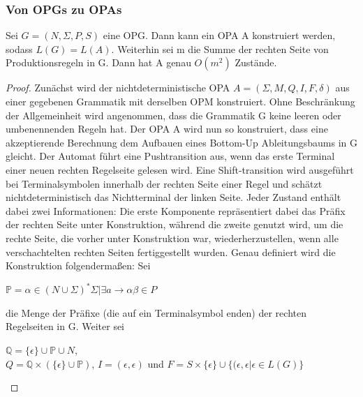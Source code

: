 \subsubsection{Von OPGs zu OPAs}
\label{opgopa}
\begin{lemma}
Sei $G=(N,\Sigma, P, S)$ eine OPG. Dann kann ein OPA A konstruiert werden, sodass $L(G)=L(A)$. Weiterhin sei m die Summe der rechten Seite von Produktionsregeln in G. Dann hat A genau $O(m^2)$ Zustände.
\end{lemma}
\begin{proof}
Zunächst wird der nichtdeterministische OPA $A=(\Sigma, M, Q, I,F, \delta)$ aus einer gegebenen Grammatik mit derselben OPM konstruiert.
Ohne Beschränkung der Allgemeinheit wird angenommen, dass die Grammatik G keine leeren oder umbenennenden Regeln hat. Der OPA A wird nun so konstruiert, dass eine akzeptierende Berechnung dem Aufbauen eines Bottom-Up Ableitungsbaums in G gleicht. Der Automat führt eine Pushtransition aus, wenn das erste Terminal einer neuen rechten Regelseite gelesen wird. Eine Shift-transition  wird ausgeführt bei Terminalsymbolen innerhalb der rechten Seite einer Regel und schätzt nichtdeterministisch das Nichtterminal der linken Seite. Jeder Zustand enthält dabei zwei Informationen: Die erste Komponente repräsentiert dabei das Präfix der rechten Seite unter Konstruktion, während die zweite genutzt wird, um die rechte Seite, die vorher unter Konstruktion war, wiederherzustellen, wenn alle verschachtelten rechten Seiten fertiggestellt wurden.
Genau definiert wird die Konstruktion folgendermaßen: Sei 
\begin{center}
$\mathbb{P}={\alpha\in (N\cup\Sigma)^*\Sigma|\exists a\rightarrow\alpha\beta\in P}$
\end{center}
die Menge der Präfixe (die auf ein Terminalsymbol enden) der rechten Regelseiten in G. Weiter sei
\begin{center}
$\mathbb{Q}=\{\epsilon\}\cup\mathbb{P}\cup N$,\\
$Q=\mathbb{Q} \times (\{\epsilon\} \cup \mathbb{P})$, $I={(\epsilon, \epsilon)}$ und $F=S\times \{\epsilon\} \cup \{(\epsilon, \epsilon|\epsilon\in L(G)\}$
\end{center}


\end{proof}
